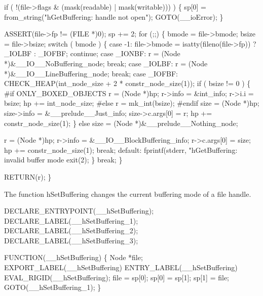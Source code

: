     if ( !(file->flags & (mask(readable) | mask(writable))) )
    \{
        sp[0] = from_string("hGetBuffering: handle not open");
        GOTO(__ioError);
    \}

    ASSERT(file->fp != (FILE *)0);
    sp += 2;
    for (;;)
    \{
        bmode = file->bmode;
        bsize = file->bsize;
        switch ( bmode )
        \{
        case -1:
            file->bmode = isatty(fileno(file->fp)) ? _IOLBF : _IOFBF;
            continue;
        case _IONBF:
            r = (Node *)&__IO__NoBuffering_node;
            break;
        case _IOLBF:
            r = (Node *)&__IO__LineBuffering_node;
            break;
        case _IOFBF:
            CHECK_HEAP(int_node_size + 2 * constr_node_size(1));
            if ( bsize != 0 )
            \{
 #if ONLY_BOXED_OBJECTS
                r       = (Node *)hp;
                r->info = &int_info;
                r->i.i  = bsize;
                hp     += int_node_size;
#else
                r = mk_int(bsize);
#endif
                size            = (Node *)hp;
                size->info      = &__prelude__Just_info;
                size->c.args[0] = r;
                hp             += constr_node_size(1);
            \}
            else
                size = (Node *)&__prelude__Nothing_node;

            r            = (Node *)hp;
            r->info      = &__IO__BlockBuffering_info;
            r->c.args[0] = size;
            hp          += constr_node_size(1);
            break;
        default:
            fprintf(stderr, "hGetBuffering: invalid buffer mode %
            exit(2);
        \}
        break;
    \}

    RETURN(r);
\}

\nwendcode{}\nwdocspar
The function {\Tt{}hSetBuffering\nwendquote} changes the current buffering mode of a
file handle.

\nwenddocs{}\plusendmoddef\nwstartdeflinemarkup{}\nwenddeflinemarkup
DECLARE_ENTRYPOINT(__hSetBuffering);
DECLARE_LABEL(__hSetBuffering_1);
DECLARE_LABEL(__hSetBuffering_2);
DECLARE_LABEL(__hSetBuffering_3);

FUNCTION(__hSetBuffering)
\{
    Node *file;
    EXPORT_LABEL(__hSetBuffering)
 ENTRY_LABEL(__hSetBuffering)
    EVAL_RIGID(__hSetBuffering);
    file  = sp[0];
    sp[0] = sp[1];
    sp[1] = file;
    GOTO(__hSetBuffering_1);
\}

